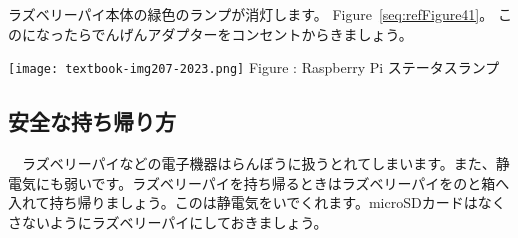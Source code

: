 \documentclass[a4paper,12pt]{jarticle}
\begin{document}
\bigskip
\flushleft
\textcolor[rgb]{0.13333334,0.13333334,0.13333334}{ラズベリーパイ本体の緑色のランプが消灯します。
  Figure~\ref{seq:refFigure41}。
  このになったらでんげんアダプターをコンセントからきましょう。}

\bigskip
\centering
\begin{minipage}{8.207cm}
  {\upshape
    \texttt{[image: textbook-img207-2023.png]}
    \newline
    Figure {\theFigure\label{seq:refFigure41}}: Raspberry Pi
    ステータスランプ}
\end{minipage}
\clearpage\subsection{安全な持ち帰り方}
\flushleft
\ \ ラズベリーパイなどの電子機器はらんぼうに扱うとれてしまいます。また、静電気にも弱いです。ラズベリーパイを持ち帰るときはラズベリーパイをのと箱へ入れて持ち帰りましょう。このは静電気をいでくれます。microSDカードはなくさないようにラズベリーパイにしておきましょう。

\clearpage
\end{document}
